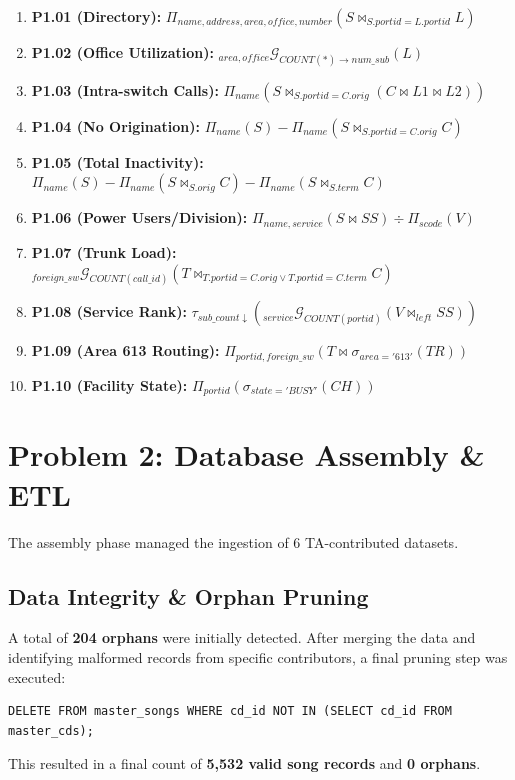 \documentclass[11pt]{article}
\begin{document}
\begin{enumerate}
    \item \textbf{P1.01 (Directory):} $\Pi_{name, address, area, office, number} (S \bowtie_{S.portid = L.portid} L)$ \cite{nel_rel_alg}
    \item \textbf{P1.02 (Office Utilization):} $_{area, office} \mathcal{G}_{COUNT(*) \rightarrow num\_sub} (L)$ \cite{nel_rel_alg}
    \item \textbf{P1.03 (Intra-switch Calls):} $\Pi_{name} (S \bowtie_{S.portid = C.orig} (C \bowtie L1 \bowtie L2))$ \cite{nel_rel_alg}
    \item \textbf{P1.04 (No Origination):} $\Pi_{name}(S) - \Pi_{name}(S \bowtie_{S.portid = C.orig} C)$ \cite{nel_rel_alg}
    \item \textbf{P1.05 (Total Inactivity):} $\Pi_{name}(S) - \Pi_{name}(S \bowtie_{S.orig} C) - \Pi_{name}(S \bowtie_{S.term} C)$ \cite{nel_rel_alg}
    \item \textbf{P1.06 (Power Users/Division):} $\Pi_{name, service}(S \bowtie SS) \div \Pi_{scode}(V)$ \cite{nel_rel_alg}
    \item \textbf{P1.07 (Trunk Load):} $_{foreign\_sw} \mathcal{G}_{COUNT(call\_id)} (T \bowtie_{T.portid=C.orig \lor T.portid=C.term} C)$ \cite{nel_rel_alg}
    \item \textbf{P1.08 (Service Rank):} $\tau_{sub\_count \downarrow} (_{service} \mathcal{G}_{COUNT(portid)} (V \bowtie_{left} SS))$ \cite{nel_rel_alg}
    \item \textbf{P1.09 (Area 613 Routing):} $\Pi_{portid, foreign\_sw} (T \bowtie \sigma_{area='613'}(TR))$ \cite{nel_rel_alg}
    \item \textbf{P1.10 (Facility State):} $\Pi_{portid} (\sigma_{state='BUSY'}(CH))$ \cite{nel_rel_alg}
\end{enumerate}


\section{Problem 2: Database Assembly \& ETL}
The assembly phase managed the ingestion of 6 TA-contributed datasets. 

\subsection{Data Integrity \& Orphan Pruning}
A total of \textbf{204 orphans} were initially detected. After merging the data and identifying malformed records from specific contributors, a final pruning step was executed:
\begin{lstlisting}
DELETE FROM master_songs WHERE cd_id NOT IN (SELECT cd_id FROM master_cds);
\end{lstlisting}
This resulted in a final count of \textbf{5,532 valid song records} and \textbf{0 orphans}.
\end{document}
